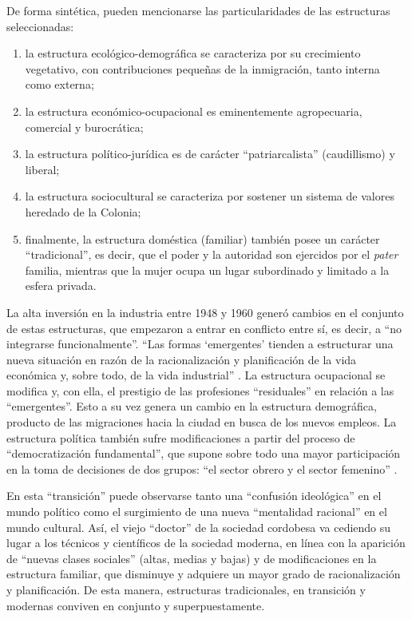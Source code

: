 De forma sintética, pueden mencionarse las particularidades de las estructuras seleccionadas:

\begin{enumerate}
\item la estructura ecológico-demográfica se caracteriza por su crecimiento vegetativo, con contribuciones pequeñas de la inmigración, tanto interna como externa;
\item la estructura económico-ocupacional es eminentemente agropecuaria, comercial y burocrática;
\item la estructura político-jurídica es de carácter \enquote{patriarcalista} (caudillismo) y liberal;
\item la estructura sociocultural se caracteriza por sostener un sistema de valores heredado de la Colonia;
\item finalmente, la estructura doméstica (familiar) también posee un carácter \enquote{tradicional}, es decir, que el poder y la autoridad son ejercidos por el \emph{pater} familia, mientras que la mujer ocupa un lugar subordinado y limitado a la esfera privada.
\end{enumerate}

La alta inversión en la industria entre 1948 y 1960 generó cambios en el conjunto de estas estructuras, que empezaron a entrar en conflicto entre sí, es decir, a \enquote{no integrarse funcionalmente}. \enquote{Las formas \enquote{emergentes} tienden a estructurar una nueva situación en razón de la racionalización y planificación de la vida económica y, sobre todo, de la vida industrial} \parencite[32]{1633-AGULLA1966}. La estructura ocupacional se modifica y, con ella, el prestigio de las profesiones \enquote{residuales} en relación a las \enquote{emergentes}. Esto a su vez genera un cambio en la estructura demográfica, producto de las migraciones hacia la ciudad en busca de los nuevos empleos. La estructura política también sufre modificaciones a partir del proceso de \enquote{democratización fundamental}, que supone sobre todo una mayor participación en la toma de decisiones de dos grupos: \enquote{el sector obrero y el sector femenino} \parencite[40]{1633-AGULLA1966}.

En esta \enquote{transición} puede observarse tanto una \enquote{confusión ideológica} en el mundo político como el surgimiento de una nueva \enquote{mentalidad racional} en el mundo cultural. Así, el viejo \enquote{doctor} de la sociedad cordobesa va cediendo su lugar a los técnicos y científicos de la sociedad moderna, en línea con la aparición de \enquote{nuevas clases sociales} (altas, medias y bajas) y de modificaciones en la estructura familiar, que disminuye y adquiere un mayor grado de racionalización y planificación. De esta manera, estructuras tradicionales, en transición y modernas conviven en conjunto y superpuestamente.

